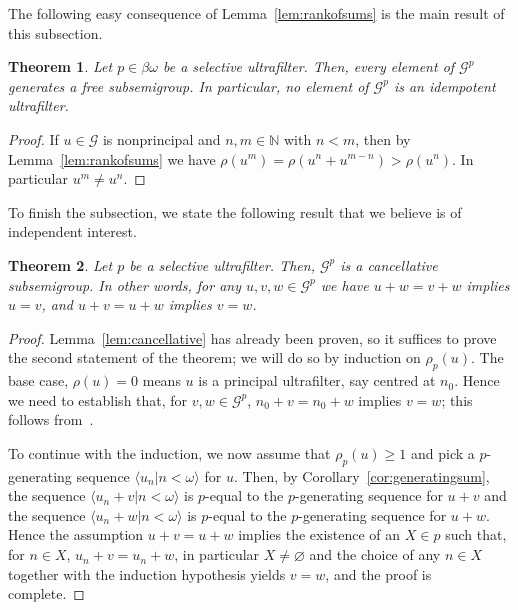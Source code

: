 \documentclass[10pt]{amsart}
\newtheorem{theorem}{Theorem}[section]
\theoremstyle{definition}
\theoremstyle{remark}
\begin{document}
The following easy consequence of Lemma~\ref{lem:rankofsums} is the main result of this subsection.

\begin{theorem}\label{thm:main-selective}
    Let $p\in\beta\omega$ be a selective ultrafilter. Then, every element of $\mathscr G^p$ generates a free subsemigroup. In particular, no element of $\mathscr G^p$ is an idempotent ultrafilter.
\end{theorem}

\begin{proof}
    If $u\in\mathscr G$ is nonprincipal and $n,m\in\mathbb N$ with $n<m$, then by Lemma~\ref{lem:rankofsums} we have $\rho(u^m)=\rho(u^n+u^{m-n})>\rho(u^n)$. In particular $u^m\neq u^n$.
\end{proof}

To finish the subsection, we state the following result that we believe is of independent interest.

\begin{theorem}\label{thm:cancellative}
    Let $p$ be a selective ultrafilter. Then, $\mathscr G^p$ is a cancellative subsemigroup. In other words, for any $u,v,w\in\mathscr G^p$ we have $u+w=v+w$ implies $u=v$, and $u+v=u+w$ implies $v=w$.
\end{theorem}

\begin{proof}
    Lemma~\ref{lem:cancellative} has already been proven, so it suffices to prove the second statement of the theorem; we will do so by induction on $\rho_p(u)$. The base case, $\rho(u)=0$ means $u$ is a principal ultrafilter, say centred at $n_0$. Hence we need to establish that, for $v,w\in\mathscr G^p$, $n_0+v=n_0+w$ implies $v=w$; this follows from~\cite[Lemma 6.28]{hindman-strauss}.
    
    To continue with the induction, we now assume that $\rho_p(u)\geq 1$ and pick a $p$-generating sequence $\langle u_n\big|n<\omega\rangle$ for $u$. Then, by Corollary~\ref{cor:generatingsum}, the sequence $\langle u_n+v\big|n<\omega\rangle$ is $p$-equal to the $p$-generating sequence for $u+v$ and the sequence $\langle u_n+w\big|n<\omega\rangle$ is $p$-equal to the $p$-generating sequence for $u+w$. Hence the assumption $u+v=u+w$ implies the existence of an $X\in p$ such that, for $n\in X$, $u_n+v=u_n+w$, in particular $X\neq\varnothing$ and the choice of any $n\in X$ together with the induction hypothesis yields $v=w$, and the proof is complete.
\end{proof}
\end{document}
